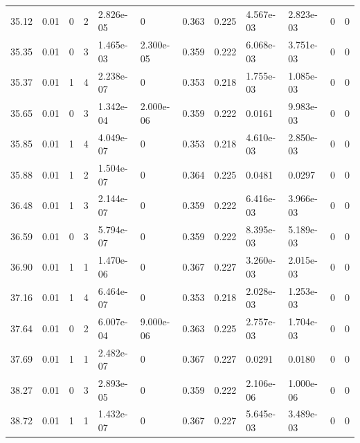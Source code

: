 \documentclass[preview]{standalone}
\begin{document}
{{{\begin{tabular}{L{1.2cm}C{1.2cm} C{0.3cm}C{0.5cm} C{1.4cm}C{1.4cm} C{1.4cm}C{1.4cm} C{1.6cm}C{1.6cm} C{1.6cm}C{1.6cm}}
  35.12  &  0.01  & 0     &  2 &  2.826e-05  & 0  &  0.363&   0.225& 4.567e-03 & 2.823e-03   &  0 & 0  \\ 
  35.35  &  0.01  & 0     &  3 &  1.465e-03  & 2.300e-05  &  0.359&   0.222& 6.068e-03 & 3.751e-03   &  0 & 0  \\ 
  35.37  &  0.01  & 1     &  4 &  2.238e-07  & 0  &  0.353&   0.218& 1.755e-03 & 1.085e-03   &  0 & 0  \\ 
  35.65  &  0.01  & 0     &  3 &  1.342e-04  & 2.000e-06  &  0.359&   0.222& 0.0161 & 9.983e-03   &  0 & 0  \\ 
  35.85  &  0.01  & 1     &  4 &  4.049e-07  & 0  &  0.353&   0.218& 4.610e-03 & 2.850e-03   &  0 & 0  \\ 
  35.88  &  0.01  & 1     &  2 &  1.504e-07  & 0  &  0.364&   0.225& 0.0481 & 0.0297   &  0 & 0  \\ 
  36.48  &  0.01  & 1     &  3 &  2.144e-07  & 0  &  0.359&   0.222& 6.416e-03 & 3.966e-03   &  0 & 0  \\ 
  36.59  &  0.01  & 0     &  3 &  5.794e-07  & 0  &  0.359&   0.222& 8.395e-03 & 5.189e-03   &  0 & 0  \\ 
  36.90  &  0.01  & 1     &  1 &  1.470e-06  & 0  &  0.367&   0.227& 3.260e-03 & 2.015e-03   &  0 & 0  \\ 
  37.16  &  0.01  & 1     &  4 &  6.464e-07  & 0  &  0.353&   0.218& 2.028e-03 & 1.253e-03   &  0 & 0  \\ 
  37.64  &  0.01  & 0     &  2 &  6.007e-04  & 9.000e-06  &  0.363&   0.225& 2.757e-03 & 1.704e-03   &  0 & 0  \\ 
  37.69  &  0.01  & 1     &  1 &  2.482e-07  & 0  &  0.367&   0.227& 0.0291 & 0.0180   &  0 & 0  \\ 
  38.27  &  0.01  & 0     &  3 &  2.893e-05  & 0  &  0.359&   0.222& 2.106e-06 & 1.000e-06   &  0 & 0  \\ 
  38.72  &  0.01  & 1     &  1 &  1.432e-07  & 0  &  0.367&   0.227& 5.645e-03 & 3.489e-03   &  0 & 0  \\ 
\hline 
\end{tabular} 

}}}
\end{document}
